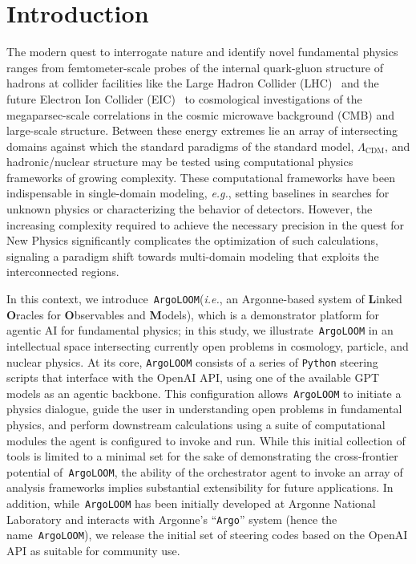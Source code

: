 \documentclass[final,3p,times,sort,compress]{elsarticle}
\newcommand{\AL}{\texttt{ArgoLOOM}\xspace}
\begin{document}
\section{Introduction}
\label{sec:intro}
%
%
The modern quest to interrogate nature and identify novel fundamental physics ranges from femtometer-scale probes of the internal quark-gluon structure of hadrons at collider facilities like the Large Hadron Collider (LHC)~\cite{Feng:2010gw} and the future Electron Ion Collider (EIC)~\cite{AbdulKhalek:2021gbh} to cosmological investigations of the megaparsec-scale correlations in the cosmic microwave
background (CMB) and large-scale structure.
%
Between these energy extremes lie an array of intersecting domains against
which the standard paradigms of the standard model, $\Lambda_\mathrm{CDM}$, and hadronic/nuclear structure
may be tested using computational physics frameworks of growing complexity.
%
These computational frameworks have been indispensable in single-domain modeling, {\it e.g.}, setting baselines in
searches for unknown physics or characterizing the behavior of detectors. 
However, the increasing complexity
required to achieve the necessary precision in the quest for New Physics significantly complicates
the optimization of such calculations, signaling a paradigm shift towards multi-domain modeling that exploits the interconnected regions.
%

In this context, we introduce~\AL ({\it i.e.}, an Argonne-based system of {\bf L}inked {\bf O}racles for
{\bf O}bservables and {\bf M}odels), which is a demonstrator platform for agentic AI for fundamental
physics; in this study, we illustrate~\AL in an intellectual space intersecting currently open problems
in cosmology, particle, and nuclear physics.
%
At its core, \AL consists of a series of \texttt{Python} steering scripts that interface with the
OpenAI API, using one of the available GPT models as an agentic backbone. This configuration
allows~\AL to initiate a physics dialogue, guide the user in understanding open problems
in fundamental physics, and perform downstream calculations using a suite of computational
modules the agent is configured to invoke and run.
%
While this initial collection of tools is limited to a minimal set for the sake of demonstrating the
cross-frontier potential of~\AL, the ability of the orchestrator agent to invoke an array of analysis frameworks implies substantial extensibility for future applications.
%
In addition, while~\AL has been initially developed at Argonne National Laboratory and interacts with Argonne's ``\texttt{Argo}'' system (hence the name~\AL), we release
the initial set of steering codes based on the OpenAI API as suitable for community use.
\end{document}

